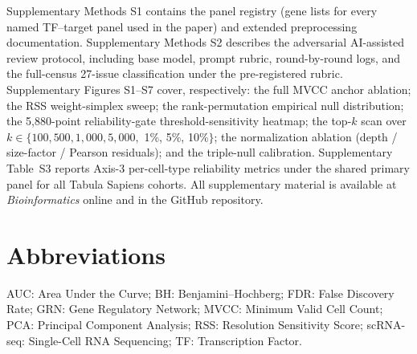 \documentclass[12pt]{article}
\begin{document}
Supplementary Methods S1 contains the panel registry (gene lists for
every named TF--target panel used in the paper) and extended
preprocessing documentation. Supplementary Methods S2 describes the
adversarial AI-assisted review protocol, including base model, prompt
rubric, round-by-round logs, and the full-census 27-issue classification
under the pre-registered rubric. Supplementary Figures S1--S7 cover,
respectively: the full MVCC anchor ablation; the RSS weight-simplex
sweep; the rank-permutation empirical null distribution; the
5{,}880-point reliability-gate threshold-sensitivity heatmap; the
top-$k$ scan over $k \in \{100, 500, 1{,}000, 5{,}000,$ 1\%, 5\%,
10\%$\}$; the normalization ablation (depth / size-factor / Pearson
residuals); and the triple-null calibration. Supplementary Table~S3
reports Axis-3 per-cell-type reliability metrics under the shared
primary panel for all Tabula Sapiens cohorts. All supplementary
material is available at \textit{Bioinformatics} online and in the
GitHub repository.

\section*{Abbreviations}

\noindent
AUC: Area Under the Curve;
BH: Benjamini--Hochberg;
FDR: False Discovery Rate;
GRN: Gene Regulatory Network;
MVCC: Minimum Valid Cell Count;
PCA: Principal Component Analysis;
RSS: Resolution Sensitivity Score;
scRNA-seq: Single-Cell RNA Sequencing;
TF: Transcription Factor.
\end{document}
